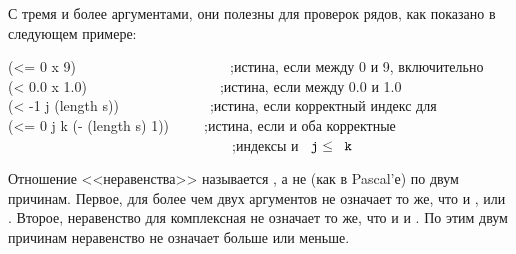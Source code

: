 \begin{defun}[Функция]
С тремя и более аргументами, они полезны для проверок рядов, как показано в
следующем примере:
\begin{lisp}
(<= 0 x 9)~~~~~~~~~~~~~~~~~~~~~~;\textrm{истина, если  между 0 и 9, включительно} \\
(< 0.0 x 1.0)~~~~~~~~~~~~~~~~~~~;\textrm{истина, если  между 0.0 и 1.0} \\
(< -1 j (length s))~~~~~~~~~~~~~;\textrm{истина, если  корректный индекс для } \\
(<= 0 j k (- (length s) 1))~~~~~;\textrm{истина, если  и  оба корректные} \\
~~~~~~~~~~~~~~~~~~~~~~~~~~~~~~~~;\textrm{индексы  и $\cdf{j}\leq\cdf{k}$}
\end{lisp}

\beforenoterule
\begin{rationale}
Отношение <<неравенства>> называется \cdf{/=}, а не \cd{<>} (как в Pascal'е) по
двум причинам. Первое, \cdf{/=} для более чем двух аргументов не означает то же,
что и  \cd{<}, или \cd{>}. Второе, неравенство для комплексная не
означает то же, что и \cd{<} и \cd{>}. По этим двум причинам неравенство не
означает больше или меньше.
\end{rationale}
\afternoterule
\end{defun}

